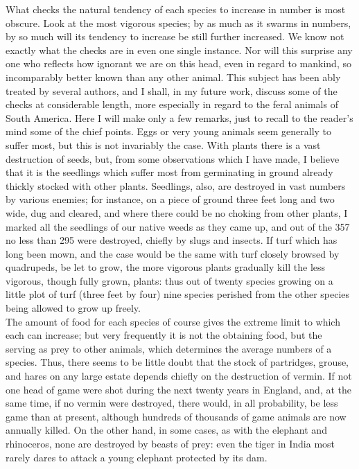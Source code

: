 \indent What checks the natural tendency of each species to increase in number is most obscure. Look at the most vigorous species; by as much as it swarms in numbers, by so much will its tendency to increase be still further increased. We know not exactly what the checks are in even one single instance. Nor will this surprise any one who reflects how ignorant we are on this head, even in regard to mankind, so incomparably better known than any other animal. This subject has been ably treated by several authors, and I shall, in my future work, discuss some of the checks at considerable length, more especially in regard to the feral animals of South America.  Here I will make only a few remarks, just to recall to the reader's mind some of the chief points. Eggs or very young animals seem generally to suffer most, but this is not invariably the case.  With plants there is a vast destruction of seeds, but, from some observations which I have made, I believe that it is the seedlings which suffer most from germinating in ground already thickly stocked with other plants. Seedlings, also, are destroyed in vast numbers by various enemies; for instance, on a piece of ground three feet long and two wide, dug and cleared, and where there could be no choking from other plants, I marked all the seedlings of our native weeds as they came up, and out of the 357 no less than 295 were destroyed, chiefly by slugs and insects. If turf which has long been mown, and the case would be the same with turf closely browsed by quadrupeds, be let to grow, the more vigorous plants gradually kill the less vigorous, though fully grown, plants: thus out of twenty species growing on a little plot of turf (three feet by four) nine species perished from the other species being allowed to grow up freely.\\
\indent The amount of food for each species of course gives the extreme limit to which each can increase; but very frequently it is not the obtaining food, but the serving as prey to other animals, which determines the average numbers of a species. Thus, there seems to be little doubt that the stock of partridges, grouse, and hares on any large estate depends chiefly on the destruction of vermin. If not one head of game were shot during the next twenty years in England, and, at the same time, if no vermin were destroyed, there would, in all probability, be less game than at present, although hundreds of thousands of game animals are now annually killed. On the other hand, in some cases, as with the elephant and rhinoceros, none are destroyed by beasts of prey: even the tiger in India most rarely dares to attack a young elephant protected by its dam.\\
